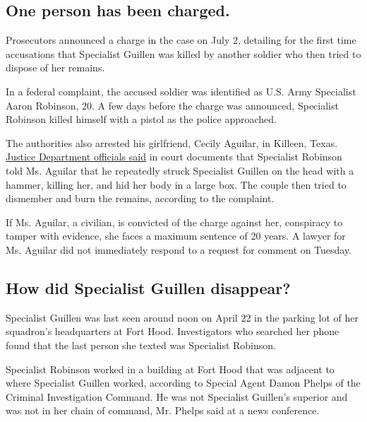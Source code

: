 \hypertarget{one-person-has-been-charged}{%
\subsection{One person has been
charged.}\label{one-person-has-been-charged}}

Prosecutors announced a charge in the case on July 2, detailing for the
first time accusations that Specialist Guillen was killed by another
soldier who then tried to dispose of her remains.

In a federal complaint, the accused soldier was identified as U.S. Army
Specialist Aaron Robinson, 20. A few days before the charge was
announced, Specialist Robinson killed himself with a pistol as the
police approached.

The authorities also arrested his girlfriend, Cecily Aguilar, in
Killeen, Texas.
\href{https://www.justice.gov/usao-wdtx/pr/killeen-woman-faces-federal-charge-connection-disappearance-us-army-specialist-vanessa}{Justice
Department officials said} in court documents that Specialist Robinson
told Ms. Aguilar that he repeatedly struck Specialist Guillen on the
head with a hammer, killing her, and hid her body in a large box. The
couple then tried to dismember and burn the remains, according to the
complaint.

If Ms. Aguilar, a civilian, is convicted of the charge against her,
conspiracy to tamper with evidence, she faces a maximum sentence of 20
years. A lawyer for Ms. Aguilar did not immediately respond to a request
for comment on Tuesday.

\hypertarget{how-did-specialist-guillen-disappear}{%
\subsection{How did Specialist Guillen
disappear?}\label{how-did-specialist-guillen-disappear}}

Specialist Guillen was last seen around noon on April 22 in the parking
lot of her squadron's headquarters at Fort Hood. Investigators who
searched her phone found that the last person she texted was Specialist
Robinson.

Specialist Robinson worked in a building at Fort Hood that was adjacent
to where Specialist Guillen worked, according to Special Agent Damon
Phelps of the Criminal Investigation Command. He was not Specialist
Guillen's superior and was not in her chain of command, Mr. Phelps said
at a news conference.

